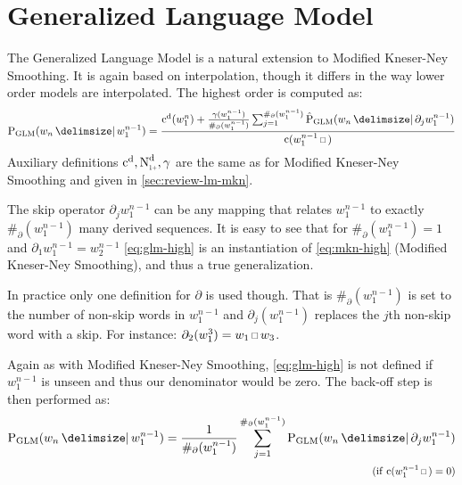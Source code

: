 \section{Generalized Language Model}
\label{sec:review-lm-glm}

The Generalized Language Model is a natural extension to Modified Kneser-Ney
Smoothing.
It is again based on interpolation, though it differs in the way lower order
models are interpolated.
The highest order is computed as:
\begin{equation}
  \label{eq:glm-high}
  \ProbGLM{w_n}{w_1^{n-1}} =
    \frac{\DiscountedCount(w_1^n) + \frac{\gamma(w_1^{n-1})}{\#_\partial(w_1^{n-1})}
                                    \sum_{j=1}^{\#_\partial(w_1^{n-1})} \ProbGLM*{w_n}{\partial_j w_1^{n-1}}}
         {\Count(w_1^{n-1} \Skp)}
\end{equation}
Auxiliary definitions $\DiscountedCount, \DiscountedCount*, \gamma$ are the same
as for Modified Kneser-Ney Smoothing and given in \cref{sec:review-lm-mkn}.

The skip operator $\partial_j w_1^{n-1}$ can be any mapping that relates
$w_1^{n-1}$ to exactly $\#_\partial(w_1^{n-1})$ many derived sequences.
It is easy to see that for $\#_\partial(w_1^{n-1}) = 1$ and
$\partial_1 w_1^{n-1} = w_2^{n-1}$ \cref{eq:glm-high} is an
instantiation of \cref{eq:mkn-high} (Modified Kneser-Ney Smoothing), and thus
a true generalization.

In practice only one definition for $\partial$ is used though.
That is $\#_\partial(w_1^{n-1})$ is set to the number of non-skip words in
$w_1^{n-1}$ and $\partial_j(w_1^{n-1})$ replaces the $j$th non-skip word with
a skip.
For instance: $\partial_2(w_1^3) = w_1 \Skp w_3$.

Again as with Modified Kneser-Ney Smoothing, \cref{eq:glm-high} is not
defined if $w_1^{n-1}$ is unseen and thus our denominator would be zero.
The back-off step is then performed as:
\begin{equation}
  \label{eq:glm-backoff}
  \begin{split}
    \ProbGLM{w_n}{w_1^{n-1}} = \frac{1}{\#_\partial(w_1^{n-1})}
                               \sum_{j=1}^{\#_\partial(w_1^{n-1})} \ProbGLM{w_n}{\partial_j w_1^{n-1}} \\
      \hfill \Condition{\Count(w_1^{n-1} \Skp) = 0}
  \end{split}
\end{equation}

